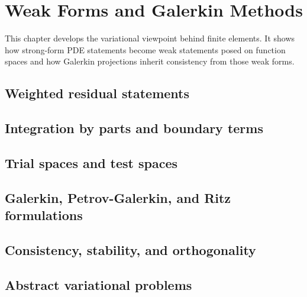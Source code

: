 \chapter{Weak Forms and Galerkin Methods}
\label{ch:weakforms}

This chapter develops the variational viewpoint behind finite elements. It
shows how strong-form PDE statements become weak statements posed on function
spaces and how Galerkin projections inherit consistency from those weak forms.

\section{Weighted residual statements}
\label{sec:weakforms:weighted_residual}


\section{Integration by parts and boundary terms}
\label{sec:weakforms:ibp}


\section{Trial spaces and test spaces}
\label{sec:weakforms:spaces}


\section{Galerkin, Petrov-Galerkin, and Ritz formulations}
\label{sec:weakforms:galerkin}


\section{Consistency, stability, and orthogonality}
\label{sec:weakforms:consistency}


\section{Abstract variational problems}
\label{sec:weakforms:abstract}

